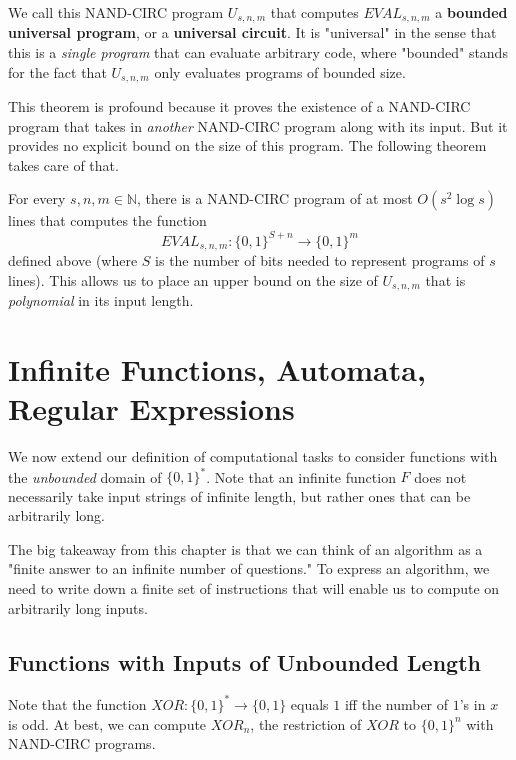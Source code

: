 \documentclass{article}
\begin{document}
  \begin{definition}
  We call this NAND-CIRC program $U_{s, n, m}$ that computes $EVAL_{s, n, m}$ a \textbf{bounded universal program}, or a \textbf{universal circuit}. It is "universal" in the sense that this is a \textit{single program} that can evaluate arbitrary code, where "bounded" stands for the fact that $U_{s, n, m}$ only evaluates programs of bounded size. 
  \end{definition}

  This theorem is profound because it proves the existence of a NAND-CIRC program that takes in \textit{another} NAND-CIRC program along with its input. But it provides no explicit bound on the size of this program. The following theorem takes care of that. 

  \begin{theorem}
  For every $s, n, m \in \mathbb{N}$, there is a NAND-CIRC program of at most $O(s^2 \log s)$ lines that computes the function 
  \[EVAL_{s, n, m}: \{0,1\}^{S+n} \longrightarrow \{0,1\}^m\]
  defined above (where $S$ is the number of bits needed to represent programs of $s$ lines). This allows us to place an upper bound on the size of $U_{s, n, m}$ that is \textit{polynomial} in its input length. 
  \end{theorem}

\section{Infinite Functions, Automata, Regular Expressions}

  We now extend our definition of computational tasks to consider functions with the \textit{unbounded} domain of $\{0,1\}^*$. Note that an infinite function $F$ does not necessarily take input strings of infinite length, but rather ones that can be arbitrarily long. 

  The big takeaway from this chapter is that we can think of an algorithm as a "finite answer to an infinite number of questions." To express an algorithm, we need to write down a finite set of instructions that will enable us to compute on arbitrarily long inputs. 

  \subsection{Functions with Inputs of Unbounded Length}
  \begin{example}
  Note that the function $XOR: \{0,1\}^* \longrightarrow \{0,1\}$ equals $1$ iff the number of $1$'s in $x$ is odd. At best, we can compute $XOR_n$, the restriction of $XOR$ to $\{0,1\}^n$ with NAND-CIRC programs. 
  \end{example}
\end{document}
